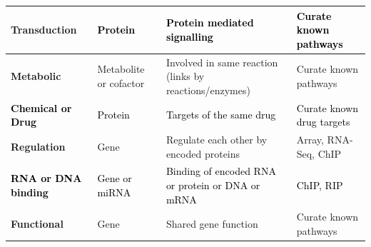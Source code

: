 \begin{flushleft}
\begin{supertabular}{m{4.0490003cm}|m{2.55cm}|m{4.301cm}|m{4.201cm}}
{{Transduction}} &
\color{black}
{\fontsize{10pt}{12.0pt}\selectfont \textcolor{black}{Protein}} &
\color{black}
{\fontsize{10pt}{12.0pt}\selectfont \textcolor{black}{Protein mediated
signalling}} &
\color{black}
{\fontsize{10pt}{12.0pt}\selectfont \textcolor{black}{Curate known
pathways}}\\\hline
\bfseries {\fontsize{10pt}{12.0pt}\selectfont Metabolic} &
{\fontsize{10pt}{12.0pt}\selectfont Metabolite or cofactor} &
{\fontsize{10pt}{12.0pt}\selectfont Involved in same reaction (links by
reactions/enzymes)} &
{\fontsize{10pt}{12.0pt}\selectfont Curate known pathways}\\\hline
{}\bfseries\color{black}
{\fontsize{10pt}{12.0pt}\selectfont \textcolor{black}{Chemical or
Drug}} &
\color{black}
{\fontsize{10pt}{12.0pt}\selectfont \textcolor{black}{Protein}} &
\color{black}
{\fontsize{10pt}{12.0pt}\selectfont \textcolor{black}{Targets of the
same drug}} &
\color{black}
{\fontsize{10pt}{12.0pt}\selectfont \textcolor{black}{Curate known drug
targets}}\\\hline
\bfseries {\fontsize{10pt}{12.0pt}\selectfont Regulation} &
{\fontsize{10pt}{12.0pt}\selectfont Gene} &
{\fontsize{10pt}{12.0pt}\selectfont Regulate each other by encoded
proteins} &
{\fontsize{10pt}{12.0pt}\selectfont Array, RNA-Seq, ChIP}\\\hline
{}\bfseries\color{black}
{\fontsize{10pt}{12.0pt}\selectfont \textcolor{black}{RNA or DNA
binding}} &
\color{black}
{\fontsize{10pt}{12.0pt}\selectfont \textcolor{black}{Gene or miRNA}} &
\color{black}
{\fontsize{10pt}{12.0pt}\selectfont \textcolor{black}{Binding of
encoded RNA or protein or DNA or mRNA}} &
\color{black}
{\fontsize{10pt}{12.0pt}\selectfont \textcolor{black}{ChIP,
RIP}}\\\hline
\bfseries {\fontsize{10pt}{12.0pt}\selectfont Functional} &
{\fontsize{10pt}{12.0pt}\selectfont Gene} &
{\fontsize{10pt}{12.0pt}\selectfont Shared gene function} &
{\fontsize{10pt}{12.0pt}\selectfont Curate known pathways}\\\hline

\end{supertabular}
\end{flushleft}

